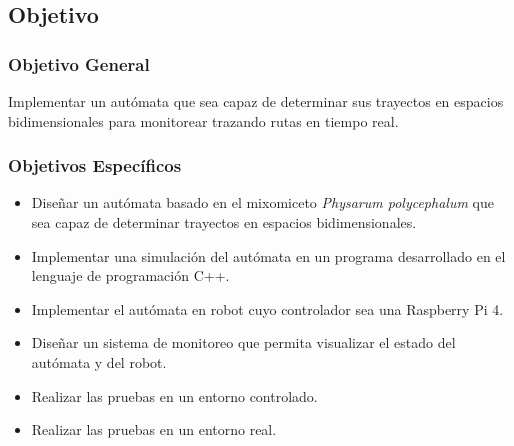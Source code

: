 \subsection{Objetivo}
\label{sec-1-1-1}
    \subsubsection{Objetivo General}
    \label{sec-1-1-1-1}
        Implementar un aut\'omata que sea capaz de determinar sus trayectos en espacios bidimensionales para
            monitorear trazando rutas en tiempo real.
    \subsubsection{Objetivos Espec\'ificos}
    \label{sec-1-1-1-2}
        \begin{itemize}
            \setlength\itemsep{-0.5em}
            \item Dise\~nar un aut\'omata basado en el mixomiceto \textit{Physarum polycephalum} que sea capaz de determinar
                trayectos en espacios bidimensionales.
            \item Implementar una simulaci\'on del aut\'omata en un programa desarrollado en el lenguaje de programaci\'on
                C++.
            \item Implementar el aut\'omata en robot cuyo controlador sea una Raspberry Pi 4.
            \item Dise\~nar un sistema de monitoreo que permita visualizar el estado del aut\'omata y del robot.
            \item Realizar las pruebas en un entorno controlado.
            \item Realizar las pruebas en un entorno real.
        \end{itemize}